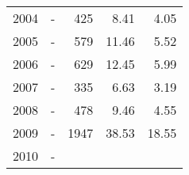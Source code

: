 \begin{longtable}{lXrrr}
     2004 &
     \multicolumn{1}{X}{ -  } &


       \num{425} &
       \num[round-mode=places,round-precision=2]{8,41} &
         \num[round-mode=places,round-precision=2]{4,05} \\

     2005 &
     \multicolumn{1}{X}{ -  } &


       \num{579} &
       \num[round-mode=places,round-precision=2]{11,46} &
         \num[round-mode=places,round-precision=2]{5,52} \\

     2006 &
     \multicolumn{1}{X}{ -  } &


       \num{629} &
       \num[round-mode=places,round-precision=2]{12,45} &
         \num[round-mode=places,round-precision=2]{5,99} \\

     2007 &
     \multicolumn{1}{X}{ -  } &


       \num{335} &
       \num[round-mode=places,round-precision=2]{6,63} &
         \num[round-mode=places,round-precision=2]{3,19} \\

     2008 &
     \multicolumn{1}{X}{ -  } &


       \num{478} &
       \num[round-mode=places,round-precision=2]{9,46} &
         \num[round-mode=places,round-precision=2]{4,55} \\

     2009 &
     \multicolumn{1}{X}{ -  } &


       \num{1947} &
       \num[round-mode=places,round-precision=2]{38,53} &
         \num[round-mode=places,round-precision=2]{18,55} \\

     2010 &
     \multicolumn{1}{X}{ -  } &



\end{longtable}
